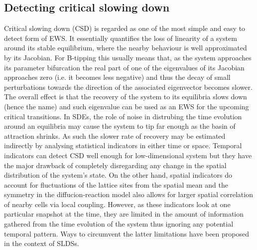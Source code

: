 \documentclass[../main.tex]{subfiles}
\begin{document}
\subsection{Detecting critical slowing down}\label{subsec3.2}
Critical slowing down (CSD) is regarded as one of the most simple and easy to detect form of EWS. It essentially quantifies the loss of linearity of a system around its stable equilibrium, where the nearby behaviour is well approximated by its Jacobian. 
For B-tipping this usually means that, as the system approaches its parameter bifurcation the real part of one of the eigenvalues of its Jacobian approaches zero (i.e. it becomes less negative) and thus the decay of small perturbations towards the direction of the associated eigenvector becomes slower. 
The overall effect is that the recovery of the system to its equilibria slows down (hence the name) and such eigenvalue can be used as an EWS for the upcoming critical transitions.
In SDEs, the role of noise in distrubing the time evolution around an equilibria may cause the system to tip far enough as the basin of attraction shrinks. 
As such the slower rate of recovery may be estimated indirectly by analysing statistical indicators in either time or space.
Temporal indicators can detect CSD well enough for low-dimensional system but they have the major drawback of completely disregarding any change in the spatial distribution of the system's state.
On the other hand, spatial indicators do account for fluctuations of the lattice sites from the spatial mean and the symmetry in the diffucion-reaction model also allows for larger spatial correlation of nearby cells via local coupling.
However, as these indicators look at one particular snapshot at the time, they are limited in the amount of information gathered from the time evolution of the system thus ignoring any potential temporal pattern.
Ways to circumvent the latter limitations have been proposed in the context of SLDSs.
\end{document}
